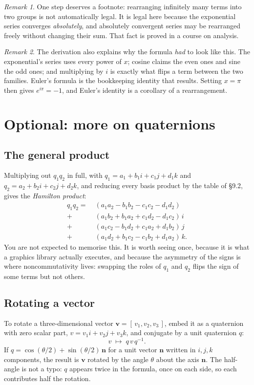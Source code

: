 \documentclass[11pt]{article}
\theoremstyle{definition}
\theoremstyle{remark}
\newtheorem*{rmk}{Remark}
\newcommand{\vc}[1]{\mathbf{#1}}
\begin{document}
\begin{rmk}
One step deserves a footnote: rearranging infinitely many terms into two groups
is not automatically legal. It is legal here because the exponential series
converges \emph{absolutely}, and absolutely convergent series may be rearranged
freely without changing their sum. That fact is proved in a course on analysis.
\end{rmk}

\begin{rmk}
The derivation also explains why the formula \emph{had} to look like this. The
exponential's series uses every power of $x$; cosine claims the even ones and
sine the odd ones; and multiplying by $i$ is exactly what flips a term between
the two families. Euler's formula is the bookkeeping identity that results.
Setting $x=\pi$ then gives $e^{i\pi}=-1$, and Euler's identity is a corollary of
a rearrangement.
\end{rmk}

\section{Optional: more on quaternions}
\subsection*{The general product}
Multiplying out $q_1q_2$ in full, with $q_1=a_1+b_1i+c_1j+d_1k$ and
$q_2=a_2+b_2i+c_2j+d_2k$, and reducing every basis product by the table of
\S9.2, gives the \emph{Hamilton product}:
\begin{align*}
  q_1q_2 = \;& (a_1a_2 - b_1b_2 - c_1c_2 - d_1d_2) \\
        +\;& (a_1b_2 + b_1a_2 + c_1d_2 - d_1c_2)\,i \\
        +\;& (a_1c_2 - b_1d_2 + c_1a_2 + d_1b_2)\,j \\
        +\;& (a_1d_2 + b_1c_2 - c_1b_2 + d_1a_2)\,k .
\end{align*}
You are not expected to memorise this. It is worth seeing once, because it is
what a graphics library actually executes, and because the asymmetry of the
signs is where noncommutativity lives: swapping the roles of $q_1$ and $q_2$
flips the sign of some terms but not others.

\subsection*{Rotating a vector}
To rotate a three-dimensional vector $\vc{v}=[\,v_1,v_2,v_3\,]$, embed it as a
quaternion with zero scalar part, $v=v_1i+v_2j+v_3k$, and conjugate by a unit
quaternion $q$:
\[
  v \;\longmapsto\; q\,v\,q^{-1} .
\]
If $q=\cos(\theta/2)+\sin(\theta/2)\,\vc{n}$ for a unit vector $\vc{n}$ written
in $i,j,k$ components, the result is $\vc{v}$ rotated by the angle $\theta$
about the axis $\vc{n}$. The half-angle is not a typo: $q$ appears twice in the
formula, once on each side, so each contributes half the rotation.
\end{document}
